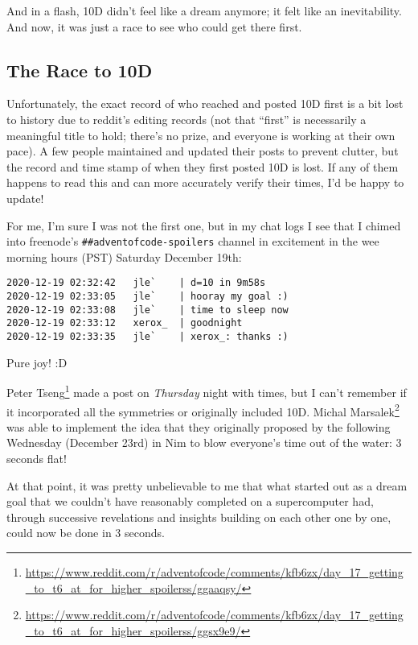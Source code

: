 \documentclass[]{article}
\renewcommand{\href}[2]{#2\footnote{\url{#1}}}
\begin{document}
And in a flash, 10D didn't feel like a dream anymore; it felt like an
inevitability. And now, it was just a race to see who could get there first.

\hypertarget{the-race-to-10d}{%
\subsection{The Race to 10D}\label{the-race-to-10d}}

Unfortunately, the exact record of who reached and posted 10D first is a bit
lost to history due to reddit's editing records (not that ``first'' is
necessarily a meaningful title to hold; there's no prize, and everyone is
working at their own pace). A few people maintained and updated their posts to
prevent clutter, but the record and time stamp of when they first posted 10D is
lost. If any of them happens to read this and can more accurately verify their
times, I'd be happy to update!

For me, I'm sure I was not the first one, but in my chat logs I see that I
chimed into freenode's \texttt{\#\#adventofcode-spoilers} channel in excitement
in the wee morning hours (PST) Saturday December 19th:

\begin{verbatim}
2020-12-19 02:32:42   jle`    | d=10 in 9m58s
2020-12-19 02:33:05   jle`    | hooray my goal :)
2020-12-19 02:33:08   jle`    | time to sleep now
2020-12-19 02:33:12   xerox_  | goodnight
2020-12-19 02:33:35   jle`    | xerox_: thanks :)
\end{verbatim}

Pure joy! :D

\href{https://www.reddit.com/r/adventofcode/comments/kfb6zx/day_17_getting_to_t6_at_for_higher_spoilerss/ggaaqsy/}{Peter
Tseng} made a post on \emph{Thursday} night with times, but I can't remember if
it incorporated all the symmetries or originally included 10D.
\href{https://www.reddit.com/r/adventofcode/comments/kfb6zx/day_17_getting_to_t6_at_for_higher_spoilerss/ggsx9e9/}{Michal
Marsalek} was able to implement the idea that they originally proposed by the
following Wednesday (December 23rd) in Nim to blow everyone's time out of the
water: 3 seconds flat!

At that point, it was pretty unbelievable to me that what started out as a dream
goal that we couldn't have reasonably completed on a supercomputer had, through
successive revelations and insights building on each other one by one, could now
be done in 3 seconds.
\end{document}
